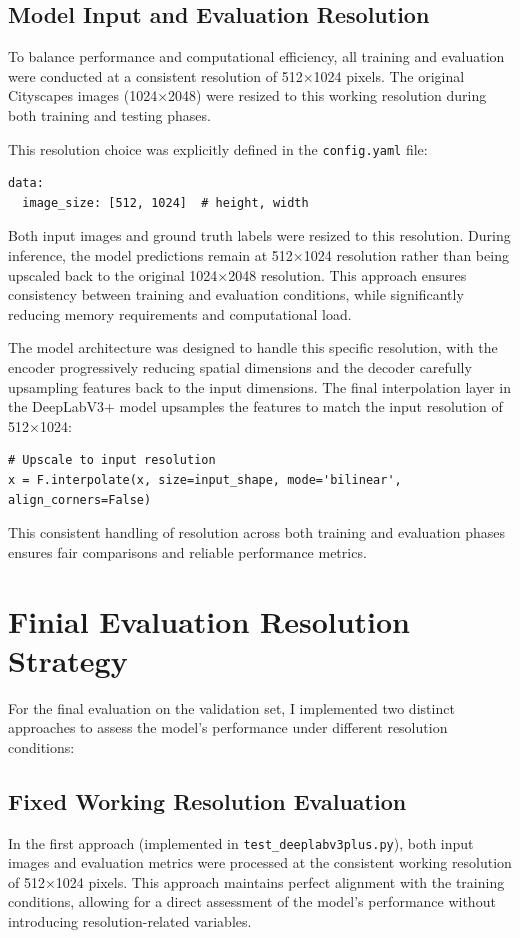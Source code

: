 \documentclass[]{article}
\begin{document}
\subsection{Model Input and Evaluation Resolution}
To balance performance and computational efficiency, all training and evaluation were conducted at a consistent resolution of 512×1024 pixels. The original Cityscapes images (1024×2048) were resized to this working resolution during both training and testing phases.

This resolution choice was explicitly defined in the \texttt{config.yaml} file:
\begin{verbatim}
data:
  image_size: [512, 1024]  # height, width
\end{verbatim}

Both input images and ground truth labels were resized to this resolution. During inference, the model predictions remain at 512×1024 resolution rather than being upscaled back to the original 1024×2048 resolution. This approach ensures consistency between training and evaluation conditions, while significantly reducing memory requirements and computational load.

The model architecture was designed to handle this specific resolution, with the encoder progressively reducing spatial dimensions and the decoder carefully upsampling features back to the input dimensions. The final interpolation layer in the DeepLabV3+ model upsamples the features to match the input resolution of 512×1024:

\begin{verbatim}
# Upscale to input resolution
x = F.interpolate(x, size=input_shape, mode='bilinear', align_corners=False)
\end{verbatim}

This consistent handling of resolution across both training and evaluation phases ensures fair comparisons and reliable performance metrics.

\section{Finial Evaluation Resolution Strategy}\label{sec:Evaluation}
For the final evaluation on the validation set, I implemented two distinct approaches to assess the model's performance under different resolution conditions:

\subsection{Fixed Working Resolution Evaluation}
In the first approach (implemented in \texttt{test\_deeplabv3plus.py}), both input images and evaluation metrics were processed at the consistent working resolution of 512×1024 pixels. This approach maintains perfect alignment with the training conditions, allowing for a direct assessment of the model's performance without introducing resolution-related variables.
\end{document}
